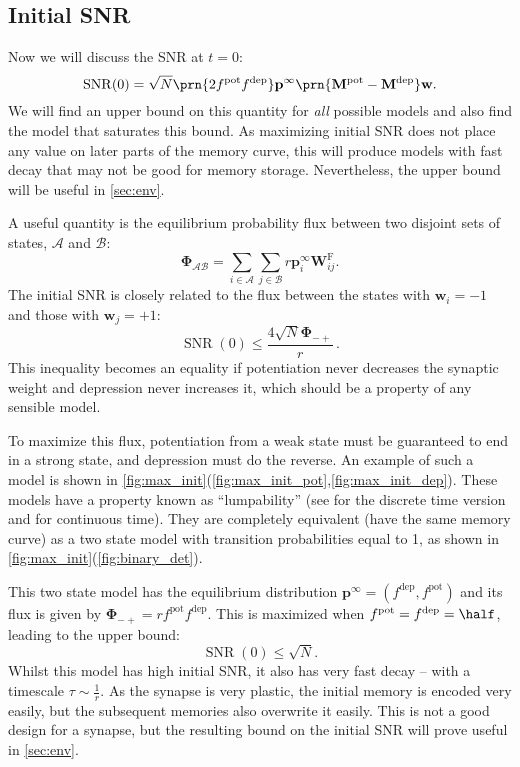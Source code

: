 \documentclass{article} %
\DeclareMathOperator{\snr}{SNR}
\newcommand{\pr}{\mathbf{p}}
\newcommand{\eq}{\pr^\infty}
\newcommand{\w}{\mathbf{w}}
\newcommand{\W}{\mathbf{W}}
\newcommand{\M}{\mathbf{M}}
\newcommand{\frg}{\W^{\mathrm{F}}}
\newcommand{\F}{\boldsymbol{\Phi}}
\newcommand{\pot}{^{\text{pot}}}
\newcommand{\dep}{^{\text{dep}}}
\newcommand{\CA}{\mathcal{A}}
\newcommand{\CB}{\mathcal{B}}
\begin{document}
\subsection{Initial SNR}\label{sec:initial}

Now we will discuss the SNR at $t=0$:
%
\begin{equation}\label{eq:init}
  \snr(0) = \sqrt{N}\prn{2 f\pot f\dep} \eq \prn{\M\pot-\M\dep} \w.
\end{equation}
%
We will find an upper bound on this quantity for \emph{all} possible models and also find the model that saturates this bound.
As maximizing initial SNR does not place any value on later parts of the memory curve, this will produce models with fast decay that may not be good for memory storage.
Nevertheless, the upper bound will be useful in \autoref{sec:env}.

A useful quantity is the equilibrium probability flux between two disjoint sets of states, $\CA$ and $\CB$:
%
\begin{equation}\label{eq:flux}
  \F_{\CA\CB} = \sum_{i\in\CA} \sum_{j\in\CB} r \eq_i \frg_{ij}.
\end{equation}
%
The initial SNR is closely related to the flux between the states with $\w_i=-1$ and those with $\w_j=+1$:
%
\begin{equation}\label{eq:initflux}
  \snr(0) \leq \frac{4\sqrt{N}\F_{-+}}{r}\,.
\end{equation}
%
This inequality becomes an equality if potentiation never decreases the synaptic weight and depression never increases it, which should be a property of any sensible model.

To maximize this flux, potentiation from a weak state must be guaranteed to end in a strong state, and depression must do the reverse.
An example of such a model is shown in \autoref{fig:max_init}(\ref{fig:max_init_pot},\ref{fig:max_init_dep}).
These models have a property known as ``lumpability'' (see \cite[\S6.3]{kemeny1960finite} for the discrete time version and \cite{burke1958markovian,Ball1993Lumpability} for continuous time).
They are completely equivalent (\ie have the same memory curve) as a two state model with transition probabilities equal to 1, as shown in \autoref{fig:max_init}(\ref{fig:binary_det}).

This two state model has the equilibrium distribution $\eq=(f\dep,f\pot)$ and its flux is given by $\F_{-+} = rf\pot f\dep$.
This is maximized when $f\pot=f\dep=\half$, leading to the upper bound:
%
\begin{equation}\label{eq:max_init}
  \snr(0) \leq \sqrt{N}.
\end{equation}
%
Whilst this model has high initial SNR, it also has very fast decay -- with a timescale $\tau\sim\frac{1}{r}$.
As the synapse is very plastic, the initial memory is encoded very easily, but the subsequent memories also overwrite it easily.
This is not a good design for a synapse, but the resulting bound on the initial SNR will prove useful in \autoref{sec:env}.
\end{document}
